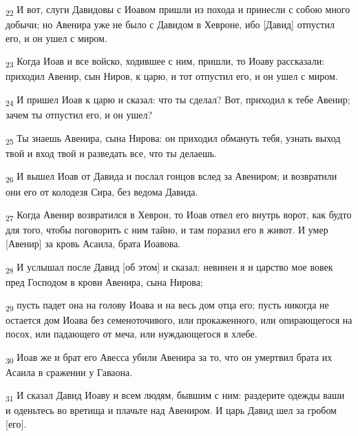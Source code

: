 \begin{tcolorbox}
\textsubscript{22} И вот, слуги Давидовы с Иоавом пришли из похода и принесли с собою много добычи; но Авенира уже не было с Давидом в Хевроне, ибо [Давид] отпустил его, и он ушел с миром.
\end{tcolorbox}
\begin{tcolorbox}
\textsubscript{23} Когда Иоав и все войско, ходившее с ним, пришли, то Иоаву рассказали: приходил Авенир, сын Ниров, к царю, и тот отпустил его, и он ушел с миром.
\end{tcolorbox}
\begin{tcolorbox}
\textsubscript{24} И пришел Иоав к царю и сказал: что ты сделал? Вот, приходил к тебе Авенир; зачем ты отпустил его, и он ушел?
\end{tcolorbox}
\begin{tcolorbox}
\textsubscript{25} Ты знаешь Авенира, сына Нирова: он приходил обмануть тебя, узнать выход твой и вход твой и разведать все, что ты делаешь.
\end{tcolorbox}
\begin{tcolorbox}
\textsubscript{26} И вышел Иоав от Давида и послал гонцов вслед за Авениром; и возвратили они его от колодезя Сира, без ведома Давида.
\end{tcolorbox}
\begin{tcolorbox}
\textsubscript{27} Когда Авенир возвратился в Хеврон, то Иоав отвел его внутрь ворот, как будто для того, чтобы поговорить с ним тайно, и там поразил его в живот. И умер [Авенир] за кровь Асаила, брата Иоавова.
\end{tcolorbox}
\begin{tcolorbox}
\textsubscript{28} И услышал после Давид [об этом] и сказал: невинен я и царство мое вовек пред Господом в крови Авенира, сына Нирова;
\end{tcolorbox}
\begin{tcolorbox}
\textsubscript{29} пусть падет она на голову Иоава и на весь дом отца его; пусть никогда не остается дом Иоава без семеноточивого, или прокаженного, или опирающегося на посох, или падающего от меча, или нуждающегося в хлебе.
\end{tcolorbox}
\begin{tcolorbox}
\textsubscript{30} Иоав же и брат его Авесса убили Авенира за то, что он умертвил брата их Асаила в сражении у Гаваона.
\end{tcolorbox}
\begin{tcolorbox}
\textsubscript{31} И сказал Давид Иоаву и всем людям, бывшим с ним: раздерите одежды ваши и оденьтесь во вретища и плачьте над Авениром. И царь Давид шел за гробом [его].
\end{tcolorbox}
